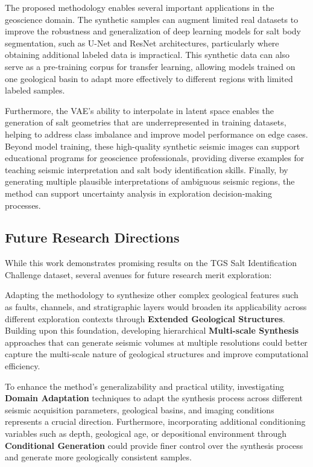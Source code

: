 \documentclass{ieeeaccess}
\begin{document}
The proposed methodology enables several important applications in the geoscience domain. The synthetic samples can augment limited real datasets to improve the robustness and generalization of deep learning models for salt body segmentation, such as U-Net and ResNet architectures, particularly where obtaining additional labeled data is impractical. This synthetic data can also serve as a pre-training corpus for transfer learning, allowing models trained on one geological basin to adapt more effectively to different regions with limited labeled samples.

Furthermore, the VAE's ability to interpolate in latent space enables the generation of salt geometries that are underrepresented in training datasets, helping to address class imbalance and improve model performance on edge cases. Beyond model training, these high-quality synthetic seismic images can support educational programs for geoscience professionals, providing diverse examples for teaching seismic interpretation and salt body identification skills. Finally, by generating multiple plausible interpretations of ambiguous seismic regions, the method can support uncertainty analysis in exploration decision-making processes.

\subsection{Future Research Directions}

While this work demonstrates promising results on the TGS Salt Identification Challenge dataset, several avenues for future research merit exploration:

Adapting the methodology to synthesize other complex geological features such as faults, channels, and stratigraphic layers would broaden its applicability across different exploration contexts through \textbf{Extended Geological Structures}. Building upon this foundation, developing hierarchical \textbf{Multi-scale Synthesis} approaches that can generate seismic volumes at multiple resolutions could better capture the multi-scale nature of geological structures and improve computational efficiency.

To enhance the method's generalizability and practical utility, investigating \textbf{Domain Adaptation} techniques to adapt the synthesis process across different seismic acquisition parameters, geological basins, and imaging conditions represents a crucial direction. Furthermore, incorporating additional conditioning variables such as depth, geological age, or depositional environment through \textbf{Conditional Generation} could provide finer control over the synthesis process and generate more geologically consistent samples.
\end{document}
